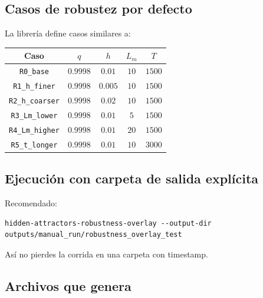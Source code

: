 \documentclass[11pt,letterpaper]{article}
\begin{document}
\subsection{Casos de robustez por defecto}

La librería define casos similares a:

\begin{center}
\begin{tabular}{ccccc}
\toprule
Caso & $q$ & $h$ & $L_m$ & $T$ \\
\midrule
\texttt{R0\_base} & $0.9998$ & $0.01$ & $10$ & $1500$ \\
\texttt{R1\_h\_finer} & $0.9998$ & $0.005$ & $10$ & $1500$ \\
\texttt{R2\_h\_coarser} & $0.9998$ & $0.02$ & $10$ & $1500$ \\
\texttt{R3\_Lm\_lower} & $0.9998$ & $0.01$ & $5$ & $1500$ \\
\texttt{R4\_Lm\_higher} & $0.9998$ & $0.01$ & $20$ & $1500$ \\
\texttt{R5\_t\_longer} & $0.9998$ & $0.01$ & $10$ & $3000$ \\
\bottomrule
\end{tabular}
\end{center}

\subsection{Ejecución con carpeta de salida explícita}

Recomendado:

\begin{lstlisting}[style=terminal]
hidden-attractors-robustness-overlay --output-dir outputs/manual_run/robustness_overlay_test
\end{lstlisting}

Así no pierdes la corrida en una carpeta con timestamp.

\subsection{Archivos que genera}
\end{document}
